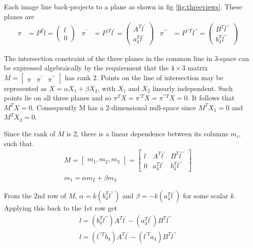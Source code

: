 Each image line back-projects to a plane as shown in fig \ref{fig:threeviews}. These planes are 
\begin{align*}
\pi &= P^{T}l = \begin{pmatrix} l \\ 0 \end{pmatrix}  & \pi^{\prime} &= P^{\prime T}l^{\prime} = \begin{pmatrix} A^{T}l^{\prime} \\ a^{T}_{4}l^{\prime} \end{pmatrix} & \pi^{\prime \prime} &= P^{\prime \prime T}l^{\prime \prime} = \begin{pmatrix} B^{T}l^{\prime \prime} \\ b^{T}_{4}l^{\prime \prime} \end{pmatrix}
\end{align*}

The intersection constraint of the three planes in the common line in 3-space can be expressed algebraically by the requirement that the $4 \times 3$ matrix $ M = \begin{bmatrix} \pi & \pi^{\prime} & \pi^{\prime \prime} \end{bmatrix}$ has rank $2$. Points on the line of intersection may be represented as $X = \alpha X_1 + \beta X_2$, with $X_1$ and $X_2$ linearly independent. Such points lie on all three planes and so $\pi^{T}X = \pi^{\prime T}X = \pi^{\prime \prime T}X = 0$. It follows that $M^{T}X = 0$. Consequently M has a 2-dimensional null-space since $M^{T}X_1 = 0$ and $M^{T}X_2 =0$.

Since the rank of $M$ is 2, there is a linear dependence between its columns $m_i$, such that.
\begin{gather*}
M = \begin{bmatrix} m_1, m_2,m_3 \end{bmatrix} = \begin{bmatrix} l & A^{T}l^{\prime} & B^{T}l^{\prime \prime} \\
  0 & a^{T}_{4}l^{\prime} & b^{T}_{4}l^{\prime \prime}
\end{bmatrix}\\
m_1 = \alpha m_2 + \beta m_3
\end{gather*}

From the 2nd row of $M$, $\alpha = k(b^{T}_4 l^{\prime \prime})$ and $\beta = -k(a^{T}_4 l^{\prime})$ for some scalar $k$. Applying this back to the 1st row get 
\begin{gather*}
l = (b^{T}_4 l^{\prime \prime })A^{T}l^{\prime} - (a^{T}_4 l^{\prime})B^{T}l^{\prime \prime}\\
l = (l^{\prime \prime T} b_{4})A^{T}l^{\prime} - (l^{\prime T} a_{4})B^{T}l^{\prime \prime}
\end{gather*}

